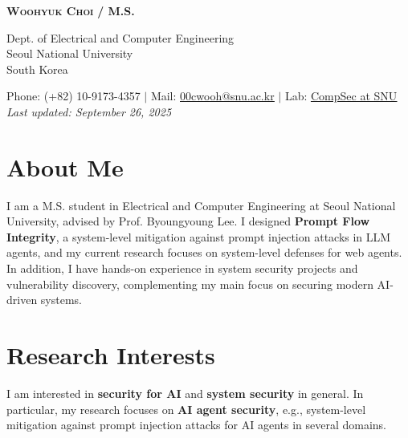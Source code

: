 \documentclass[letterpaper,11pt]{article}
\begin{document}


\begin{center}
  \textbf{\Huge \scshape Woohyuk Choi} \textbf{ /  M.S.} \\ \vspace{10pt}

  Dept. of Electrical and Computer Engineering \\
  Seoul National University \\
  South Korea \\ \vspace{10pt}

  \small Phone: (+82) 10-9173-4357 $|$ Mail:
  \href{mailto:00cwooh@snu.ac.kr}{\underline{00cwooh@snu.ac.kr}} $|$
  Lab: \href{https://compsec.snu.ac.kr}{\underline{CompSec at SNU}} \\
  \vspace{5pt}
  \textit{\small Last updated: September 26, 2025}
\end{center}

\vspace{15pt}
\section{About Me} 
I am a M.S. student in Electrical and Computer Engineering at
Seoul National University, advised by Prof. Byoungyoung Lee.
%
I designed \textbf{Prompt Flow Integrity}, a system-level
mitigation against prompt injection attacks in LLM agents,
and my current research focuses on system-level defenses for
web agents. 
%
In addition, I have hands-on experience in system security projects and
vulnerability discovery, complementing my main focus on securing
modern AI-driven systems.

\vspace{10pt}

\section{Research Interests}

I am interested in \textbf{security for AI} and \textbf{system security}
in general.
%
In particular, my research focuses on \textbf{AI agent security}, e.g., 
system-level mitigation against prompt injection attacks for AI agents
in several domains.

\vspace{10pt}
\end{document}
